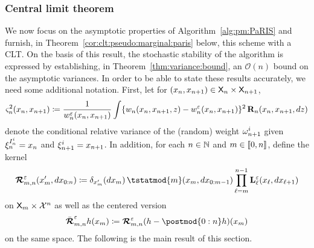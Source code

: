 
\subsubsection*{Central limit theorem}

We now focus on the asymptotic properties of Algorithm~\ref{alg:pm:PaRIS} and furnish, in Theorem~\ref{cor:clt:pseudo:marginal:paris} below, this scheme with a CLT. On the basis of this result, the stochastic stability of the algorithm is expressed by establishing, in Theorem~\ref{thm:variance:bound}, an $\mathcal{O}(n)$ bound on the asymptotic variances. In order to be able to state these results accurately, we need some additional notation. First, let 
 for $(x_n, x_{n + 1}) \in \mathsf{X}_n \times \mathsf{X}_{n + 1}$, 
\begin{multline} \label{eq:def:ukestvar}
\ukestvar{n}(x_n, x_{n + 1}) \eqdef 
\frac{1}{\wgtfuncmod{n}(x_n, x_{n + 1})} \int \{ \wgtfunc{n}(x_n, x_{n + 1}, z) - \wgtfuncmod{n}(x_n, x_{n + 1}) \}^2 \, \ukdist{n}(x_n, x_{n + 1}, \rmd z)
\end{multline}
denote the conditional relative variance of the (random) weight $\omega_{n + 1}^{i}$ given $\xi_{n}^{I_{n}^{i}} = x_n$ and $\xi_{n + 1}^{i}= x_{n + 1}$. In addition, for each $n \in \mathbb{N}$ and $m \in \llbracket 0, n \rrbracket$, define the kernel  
\begin{equation} \label{eq:def:retrokmodmod}
    \retrokmodmod_{m, n}(x_m', \rmd x_{0:n}) \eqdef \delta_{x_m'}(\rmd x_m) \,  
    \tstatmod{m}(x_m, \rmd x_{0:m - 1})
    \prod_{\ell = m}^{n - 1} \ukmod{\ell}(x_\ell, \rmd x_{\ell + 1})
\end{equation}
on $\mathsf{X}_m \times \mathcal{X}^n$ as well as the centered version 
\begin{equation} \label{eq:def:retrokmodmodnorm}
\retrokmodmodnorm_{m, n} h (x_m) \eqdef  \retrokmodmod_{m, n}(h - \postmod{0:n} h)(x_m) 
\end{equation}
on the same space. The following is the main result of this section. 
